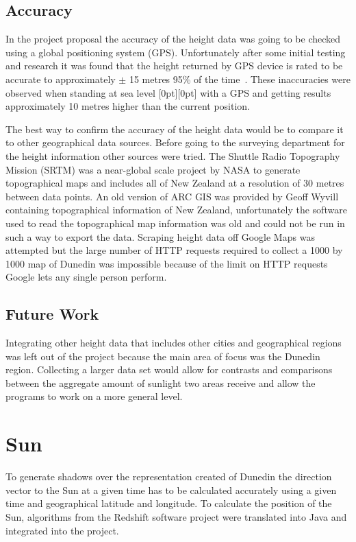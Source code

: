\documentclass[12pt]{report}
\newcommand{\note}[1]{\raisebox{0pt}[0pt][0pt]{\pdfcomment[open=true]{#1}}}
\begin{document}
\subsection{Accuracy}
In the project proposal the accuracy of the height data was going to be checked using a global positioning system (GPS). Unfortunately after some initial testing and research it was found that the height returned by GPS device is rated to be accurate to approximately $\pm$ 15 metres 95\% of the time~\cite{gpsaltitude}. These inaccuracies were observed when standing at sea level \note{on a beach don't think I need to say this} with a GPS and getting results approximately 10 metres higher than the current position.

The best way to confirm the accuracy of the height data would be to compare it to other geographical data sources. Before going to the surveying department for the height information other sources were tried. The Shuttle Radio Topography Mission (SRTM)\cite{srtm} was a near-global scale project by NASA to generate topographical maps and includes all of New Zealand at a resolution of 30 metres between data points. An old version of ARC GIS was provided by Geoff Wyvill containing topographical information of New Zealand, unfortunately the software used to read the topographical map information was old and could not be run in such a way to export the data. Scraping height data off Google Maps\cite{gmaps} was attempted but the large number of HTTP requests required to collect a 1000 by 1000 map of Dunedin was impossible because of the limit on HTTP requests Google lets any single person perform.

\subsection{Future Work}
Integrating other height data that includes other cities and geographical regions was left out of the project because the main area of focus was the Dunedin region. Collecting a larger data set would allow for contrasts and comparisons between the aggregate amount of sunlight two areas receive and allow the programs to work on a more general level.

\section{Sun}
To generate shadows over the representation created of Dunedin the direction vector to the Sun at a given time has to be calculated accurately using a given time and geographical latitude and longitude. To calculate the position of the Sun, algorithms from the Redshift\cite{redshift} software project were translated into Java and integrated into the project.
\end{document}
